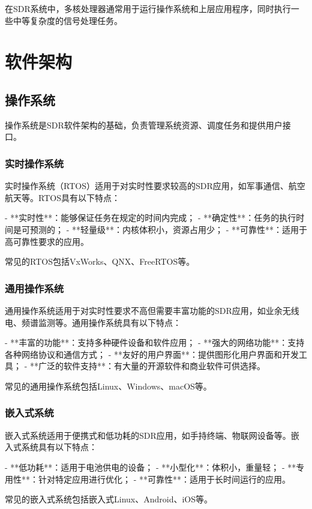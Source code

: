﻿\documentclass[UTF8]{ctexbook}
\begin{document}
在SDR系统中，多核处理器通常用于运行操作系统和上层应用程序，同时执行一些中等复杂度的信号处理任务。
\section{软件架构}

\subsection{操作系统}

操作系统是SDR软件架构的基础，负责管理系统资源、调度任务和提供用户接口。

\subsubsection{实时操作系统}

实时操作系统（RTOS）适用于对实时性要求较高的SDR应用，如军事通信、航空航天等。RTOS具有以下特点：

- **实时性**：能够保证任务在规定的时间内完成；
- **确定性**：任务的执行时间是可预测的；
- **轻量级**：内核体积小，资源占用少；
- **可靠性**：适用于高可靠性要求的应用。

常见的RTOS包括VxWorks、QNX、FreeRTOS等。

\subsubsection{通用操作系统}

通用操作系统适用于对实时性要求不高但需要丰富功能的SDR应用，如业余无线电、频谱监测等。通用操作系统具有以下特点：

- **丰富的功能**：支持多种硬件设备和软件应用；
- **强大的网络功能**：支持各种网络协议和通信方式；
- **友好的用户界面**：提供图形化用户界面和开发工具；
- **广泛的软件支持**：有大量的开源软件和商业软件可供选择。

常见的通用操作系统包括Linux、Windows、macOS等。

\subsubsection{嵌入式系统}

嵌入式系统适用于便携式和低功耗的SDR应用，如手持终端、物联网设备等。嵌入式系统具有以下特点：

- **低功耗**：适用于电池供电的设备；
- **小型化**：体积小，重量轻；
- **专用性**：针对特定应用进行优化；
- **可靠性**：适用于长时间运行的应用。

常见的嵌入式系统包括嵌入式Linux、Android、iOS等。
\end{document}
